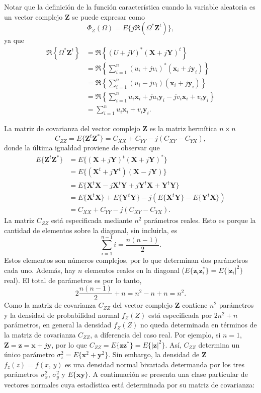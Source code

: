 \documentclass[a4paper]{report}
\newcommand{\X}{\mathbf{X}}
\newcommand{\Y}{\mathbf{Y}}
\newcommand{\Z}{\mathbf{Z}}
\newcommand{\x}{\mathbf{x}}
\newcommand{\y}{\mathbf{y}}
\newcommand{\z}{\mathbf{z}}
\begin{document}
Notar que la definición de la función característica cuando la variable aleatoria es un vector complejo \(\Z\) se puede expresar como
\[
 \Phi_Z(\Omega)=E\{j\Re(\Omega^*\Z^t)\},
\]
ya que
\begin{align*}
 \Re\left\{\Omega^*\Z^t\right\}&=\Re\left\{(U+jV)^*(\X+j\Y)^t\right\}\\
   &=\Re\left\{\sum_{i=1}^n(u_i+jv_i)^*(\x_i+j\y_i)\right\}\\
   &=\Re\left\{\sum_{i=1}^n(u_i-jv_i)(\x_i+j\y_i)\right\}\\
   &=\Re\left\{\sum_{i=1}^n u_i\x_i+ju_i\y_i-jv_i\x_i+v_i\y_i\right\}\\
   &=\sum_{i=1}^n u_i\x_i+v_i\y_i.
\end{align*}

La matriz de covarianza del vector complejo \(\Z\) es la matriz hermítica \(n\times n\)
\begin{equation}\label{eq:complex_vector_covariance_matrix}
 C_{ZZ}=E\{\Z^t\Z^*\}=C_{XX}+C_{YY}-j(C_{XY}-C_{YX}),
\end{equation}
donde la última igualdad proviene de observar que
\begin{align*}
 E\{\Z^t\Z^*\}&=E\{(\X+j\Y)^t(\X+j\Y)^*\}\\
  &=E\{(\X^t+j\Y^t)(\X-j\Y)\}\\
  &=E\{\X^t\X-j\X^t\Y+j\Y^t\X+\Y^t\Y\}\\
  &=E\{\X^t\X\}+E\{\Y^t\Y\}-j\left(E\{\X^t\Y\}-E\{\Y^t\X\}\right)\\
  &=C_{XX}+C_{YY}-j(C_{XY}-C_{YX}).
\end{align*}
La matriz \(C_{ZZ}\) está especificada mediante \(n^2\) parámetros reales. Esto es porque la cantidad de elementos sobre la diagonal, sin incluirla, es
\[
 \sum_{i=1}^{n-1}i=\frac{n(n-1)}{2}.
\]
Estos elementos son números complejos, por lo que determinan dos parámetros cada uno. Además, hay \(n\) elementos reales en la diagonal (\(E\{\z_i\z_i^*\}=E\{|\z_i|^2\}\) real). El total de parámetros  es por lo tanto,
\[
 2\frac{n(n-1)}{2}+n=n^2-n+n=n^2.
\]
Como la matriz de covarianza \(C_{ZZ}\) del vector complejo \(\Z\) contiene \(n^2\) parámetros y la densidad de probabilidad normal \(f_Z(Z)\) está especificada por \(2n^2+n\) parámetros, en general la densidad \(f_Z(Z)\) no queda determinada en términos de la matriz de covarianza \(C_{ZZ}\), a diferencia del caso real. Por ejemplo, si \(n=1\), \(\Z=\z=\x+j\y\), por lo que \(C_{ZZ}=E\{\z\z^*\}=E\{|\z|^2\}\). Así, \(C_{ZZ}\) determina un único parámetro \(\sigma_z^2=E\{\x^2+\y^2\}\). Sin embargo, la densidad de \(\Z\) \(f_z(z)=f(x,\,y)\) es una densidad normal bivariada determanda por los tres parámetros \(\sigma_x^2\), \(\sigma_y^2\) y \(E\{\x\y\}\). A continuación se presenta una clase particular de vectores normales cuya estadística está determinada por su matriz de covarianza:\\
\end{document}

